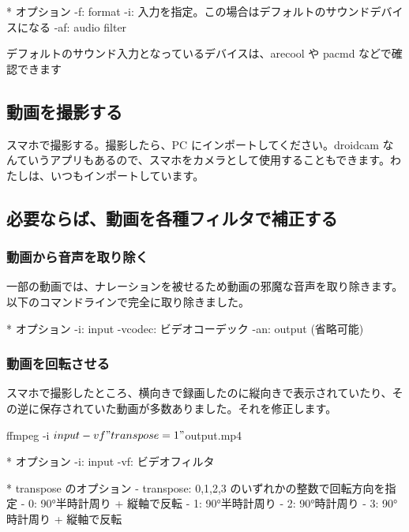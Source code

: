 \documentclass[mingoth,a4paper]{jsarticle}
\begin{document}
\begin{commandline}
* オプション
  -f: format
  -i: 入力を指定。この場合はデフォルトのサウンドデバイスになる
  -af: audio filter
\end{commandline}

デフォルトのサウンド入力となっているデバイスは、arecool や pacmd などで確認できます

\subsection{動画を撮影する}
スマホで撮影する。撮影したら、PC にインポートしてください。droidcam なんていうアプリもあるので、スマホをカメラとして使用することもできます。わたしは、いつもインポートしています。

\subsection{必要ならば、動画を各種フィルタで補正する}

\subsubsection{動画から音声を取り除く}
一部の動画では、ナレーションを被せるため動画の邪魔な音声を取り除きます。以下のコマンドラインで完全に取り除きました。

\begin{commandline}
* オプション
  -i: input
  -vcodec: ビデオコーデック
  -an: output (省略可能)
\end{commandline}

\subsubsection{動画を回転させる}
スマホで撮影したところ、横向きで録画したのに縦向きで表示されていたり、その逆に保存されていた動画が多数ありました。それを修正します。
\begin{commandline}
ffmpeg -i ${input} -vf "transpose=1" ${output}.mp4
\end{commandline}

\begin{commandline}
* オプション
  -i: input
  -vf: ビデオフィルタ

* transpose のオプション
  - transpose: 0,1,2,3 のいずれかの整数で回転方向を指定
	  - 0: 90°半時計周り + 縦軸で反転
	  - 1: 90°半時計周り
	  - 2: 90°時計周り
	  - 3: 90°時計周り + 縦軸で反転
\end{commandline}
\end{document}
